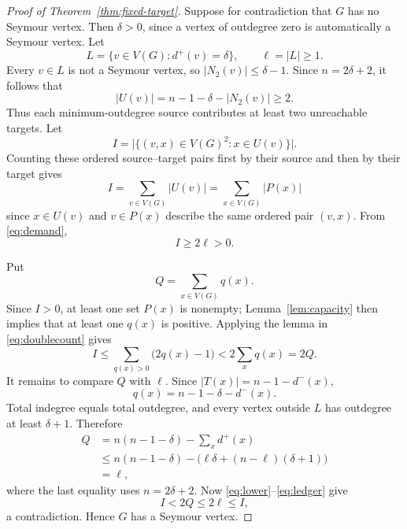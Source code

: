 \documentclass[10pt,a4paper]{amsart}
\begin{document}
\begin{proof}[Proof of Theorem~\ref{thm:fixed-target}]
Suppose for contradiction that $G$ has no Seymour vertex.  Then $\delta>0$,
since a vertex of outdegree zero is automatically a Seymour vertex.  Let
\[
 L=\{v\in V(G):d^+(v)=\delta\},
 \qquad \ell=|L|\ge1.
\]
Every $v\in L$ is not a Seymour vertex, so $|N_2(v)|\le\delta-1$.
Since $n=2\delta+2$, it follows that
\begin{equation}\label{eq:demand}
 |U(v)|=n-1-\delta-|N_2(v)|\ge2.
\end{equation}
Thus each minimum-outdegree source contributes at least two unreachable
targets. Let
\[
 I=\bigl|\{(v,x)\in V(G)^2:x\in U(v)\}\bigr|.
\]
Counting these ordered source--target pairs first by their source and then by
their target gives
\begin{equation}\label{eq:doublecount}
 I=\sum_{v\in V(G)}|U(v)|
 =\sum_{x\in V(G)}|P(x)|
\end{equation}
since $x\in U(v)$ and $v\in P(x)$ describe the
same ordered pair $(v,x)$.  From \eqref{eq:demand},
\begin{equation}\label{eq:lower}
 I\ge2\ell>0.
\end{equation}

\noindent Put
\[
 Q=\sum_{x\in V(G)}q(x).
\]
Since $I>0$, at least one set $P(x)$ is nonempty; Lemma~\ref{lem:capacity}
then implies that at least one $q(x)$ is positive.  Applying the lemma
in \eqref{eq:doublecount} gives
\begin{equation}\label{eq:capacity}
 I\le\sum_{q(x)>0}\bigl(2q(x)-1\bigr)
   <2\sum_xq(x)=2Q.
\end{equation}
It remains to compare $Q$ with $\ell$.  Since
$|T(x)|=n-1-d^-(x)$,
\[
 q(x)=n-1-\delta-d^-(x).
\]
Total indegree equals total outdegree, and every vertex outside $L$ has
outdegree at least $\delta+1$.  Therefore
\begin{equation}\label{eq:ledger}
\begin{aligned}
 Q
 &=n(n-1-\delta)-\sum_xd^+(x)\\
 &\le n(n-1-\delta)
   -\bigl(\ell\delta+(n-\ell)(\delta+1)\bigr)\\
 &=\ell,
\end{aligned}
\end{equation}
where the last equality uses $n=2\delta+2$.
Now \eqref{eq:lower}--\eqref{eq:ledger} give
\[
 I<2Q\le2\ell\le I,
\]
a contradiction.  Hence $G$ has a Seymour vertex.
\end{proof}
\end{document}
